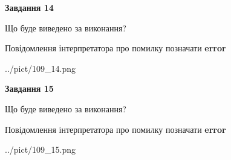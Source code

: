 \documentclass[11pt, ukrainian]{article}
\begin{document}
{\begin {large}
{\begin {center}\textbf{Завдання 14}\end {center}}\par
Що буде виведено за виконання? \par
Повідомлення інтерпретатора про помилку позначати \textbf{error}

\begin{center}
	{../pict/109_14.png}
\end{center}
\newpage

{\begin {center}\textbf{Завдання 15}\end {center}}\par
Що буде виведено за виконання? \par
Повідомлення інтерпретатора про помилку позначати \textbf{error}

\begin{center}
	{../pict/109_15.png}
\end{center}
\newpage

\end {large}}
\end{document}
